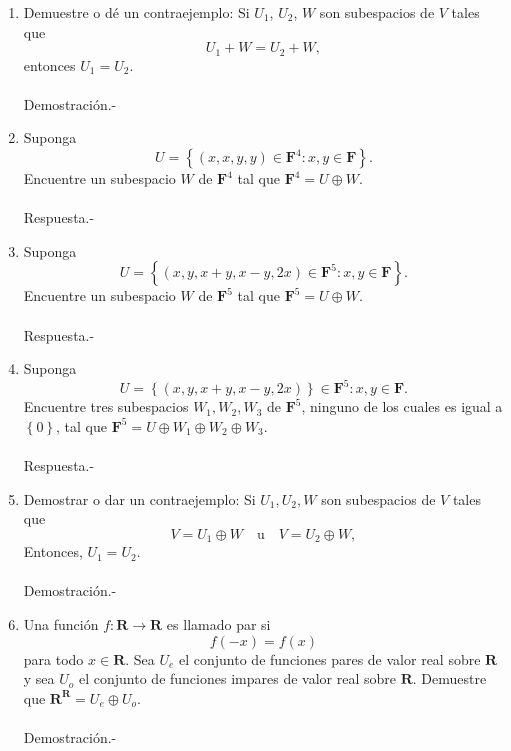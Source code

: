 \begin{enumerate}[\bfseries 1.]
    \item Demuestre o dé un contraejemplo: Si $U_1$, $U_2$, $W$ son subespacios de $V$ tales que 
    $$U_1+W=U_2+W,$$
    entonces $U_1=U_2$.\\\\
	Demostración.-\; 

    \item Suponga
    $$U=\left\{(x,x,y,y)\in \textbf{F}^4:x,y\in \textbf{F}\right\}.$$
    Encuentre un subespacio $W$ de $\textbf{F}^4$ tal que $\textbf{F}^4=U \oplus W.$\\\\
	Respuesta.-\; 

    \item Suponga
    $$U=\left\{(x,y,x+y,x-y,2x)\in \textbf{F}^5: x,y\in \textbf{F}\right\}.$$
    Encuentre un subespacio $W$ de $\textbf{F}^5$ tal que $\textbf{F}^5=U\oplus W.$\\\\
	Respuesta.-\;

    \item Suponga
    $$U=\left\{(x,y,x+y,x-y,2x)\right\}\in \textbf{F}^5: x,y \in \textbf{F}.$$
    Encuentre tres subespacios $W_1,W_2,W_3$ de $\textbf{F}^5$, ninguno de los cuales es igual a $\left\{0\right\}$, tal que $\textbf{F}^5=U\oplus W_1\oplus W_2 \oplus W_3.$\\\\
    	Respuesta.-\;

    \item Demostrar o dar un contraejemplo: Si $U_1,U_2,W$ son subespacios de $V$ tales que 
    $$V=U_1\oplus W \quad \mbox{u} \quad V=U_2\oplus W,$$
    Entonces, $U_1=U_2.$\\\\
    	Demostración.-\;

    \item Una función $f:\textbf{R}\to \textbf{R}$ es llamado par si
    $$f(-x)=f(x)$$
    para todo $x\in \textbf{R}.$ Sea $U_e$ el conjunto de funciones pares de valor real sobre $\textbf{R}$ y sea $U_o$ el conjunto de funciones impares de valor real sobre $\textbf{R}$. Demuestre que $\textbf{R}^{\textbf{R}}=U_e \oplus U_o.$\\\\
	Demostración.-\; 

	

\end{enumerate}


